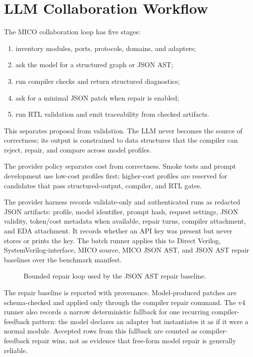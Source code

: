 \section{LLM Collaboration Workflow}

The MICO collaboration loop has five stages:

\begin{enumerate}
  \item inventory modules, ports, protocols, domains, and adapters;
  \item ask the model for a structured graph or JSON AST;
  \item run compiler checks and return structured diagnostics;
  \item ask for a minimal JSON patch when repair is enabled;
  \item run RTL validation and emit traceability from checked artifacts.
\end{enumerate}

This separates proposal from validation. The LLM never becomes the source of correctness; its output is constrained to data structures that the compiler can reject, repair, and compare across model profiles.

The provider policy separates cost from correctness. Smoke tests and prompt development use low-cost profiles first; higher-cost profiles are reserved for candidates that pass structured-output, compiler, and RTL gates.

The provider harness records validate-only and authenticated runs as redacted JSON artifacts: profile, model identifier, prompt hash, request settings, JSON validity, token/cost metadata when available, repair turns, compiler attachment, and EDA attachment. It records whether an API key was present but never stores or prints the key. The batch runner applies this to Direct Verilog, SystemVerilog-interface, MICO source, MICO JSON AST, and JSON AST repair baselines over the benchmark manifest.

\begin{figure}[t]
  \centering
  \caption{Bounded repair loop used by the JSON AST repair baseline.}
  \label{fig:repair-loop}
\end{figure}

The repair baseline is reported with provenance. Model-produced patches are
schema-checked and applied only through the compiler repair command. The v4
runner also records a narrow deterministic fallback for one recurring
compiler-feedback pattern: the model declares an adapter but instantiates it as
if it were a normal module. Accepted rows from this fallback are counted as
compiler-feedback repair wins, not as evidence that free-form model repair is
generally reliable.
